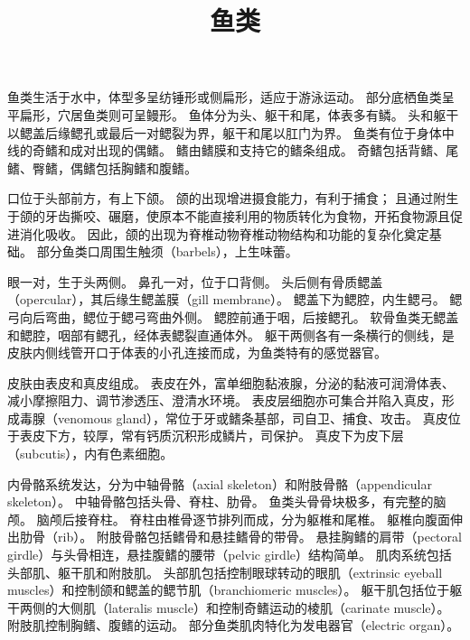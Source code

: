\documentclass[11pt]{article}
\title{鱼类}
\date{}
\begin{document}
  \maketitle

  \linenumbers
鱼类生活于水中，体型多呈纺锤形或侧扁形，适应于游泳运动。
部分底栖鱼类呈平扁形，穴居鱼类则可呈鳗形。
鱼体分为头、躯干和尾，体表多有鳞。
头和躯干以鳃盖后缘鳃孔或最后一对鳃裂为界，躯干和尾以肛门为界。
鱼类有位于身体中线的奇鳍和成对出现的偶鳍。
鳍由鳍膜和支持它的鳍条组成。
奇鳍包括背鳍、尾鳍、臀鳍，偶鳍包括胸鳍和腹鳍。

\newline

口位于头部前方，有上下颌。
颌的出现增进摄食能力，有利于捕食；
且通过附生于颌的牙齿撕咬、碾磨，使原本不能直接利用的物质转化为食物，开拓食物源且促进消化吸收。
因此，颌的出现为脊椎动物脊椎动物结构和功能的复杂化奠定基础。
部分鱼类口周围生触须（barbels），上生味蕾。

\newline

眼一对，生于头两侧。
鼻孔一对，位于口背侧。
头后侧有骨质鳃盖（opercular），其后缘生鳃盖膜（gill membrane）。
鳃盖下为鳃腔，内生鳃弓。
鳃弓向后弯曲，鳃位于鳃弓弯曲外侧。
鳃腔前通于咽，后接鳃孔。
软骨鱼类无鳃盖和鳃腔，咽部有鳃孔，经体表鳃裂直通体外。
躯干两侧各有一条横行的侧线，是皮肤内侧线管开口于体表的小孔连接而成，为鱼类特有的感觉器官。

\newline

皮肤由表皮和真皮组成。
表皮在外，富单细胞黏液腺，分泌的黏液可润滑体表、减小摩擦阻力、调节渗透压、澄清水环境。
表皮层细胞亦可集合并陷入真皮，形成毒腺（venomous gland），常位于牙或鳍条基部，司自卫、捕食、攻击。
真皮位于表皮下方，较厚，常有钙质沉积形成鳞片，司保护。
真皮下为皮下层（subcutis），内有色素细胞。

\newline

内骨骼系统发达，分为中轴骨骼（axial skeleton）和附肢骨骼（appendicular skeleton）。
中轴骨骼包括头骨、脊柱、肋骨。
鱼类头骨骨块极多，有完整的脑颅。
脑颅后接脊柱。
脊柱由椎骨逐节排列而成，分为躯椎和尾椎。
躯椎向腹面伸出肋骨（rib）。
附肢骨骼包括鳍骨和悬挂鳍骨的带骨。
悬挂胸鳍的肩带（pectoral girdle）与头骨相连，悬挂腹鳍的腰带（pelvic girdle）结构简单。
肌肉系统包括头部肌、躯干肌和附肢肌。
头部肌包括控制眼球转动的眼肌（extrinsic eyeball muscles）和控制颌和鳃盖的鳃节肌（branchiomeric muscles）。
躯干肌包括位于躯干两侧的大侧肌（lateralis muscle）和控制奇鳍运动的棱肌（carinate muscle）。
附肢肌控制胸鳍、腹鳍的运动。
部分鱼类肌肉特化为发电器官（electric organ）。
\end{document}
